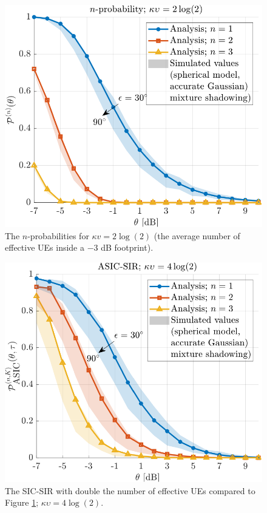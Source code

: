 \documentclass[lettersize,journal]{IEEEtran}
\begin{document}
\begin{figure}[h]
  \centering
  \includegraphics[width=\linewidth]{nprobability.pdf}
  \caption{The $n$-probabilities for $\kappa v=2 \log(2)$ (the average number of effective UEs inside a $-3$ dB footprint). 
} 
  \label{fig:nprobability}
\end{figure}


  
\begin{figure}[h]
  \centering
  \includegraphics[width=\linewidth]{ASICSIR.pdf}
  \caption{The SIC-SIR with double the  number of effective UEs compared to Figure \ref{fig:nprobability}; $\kappa \upsilon = 4 \log(2)$. } 
  \label{fig:ASICSIR}
\end{figure}
\end{document}
